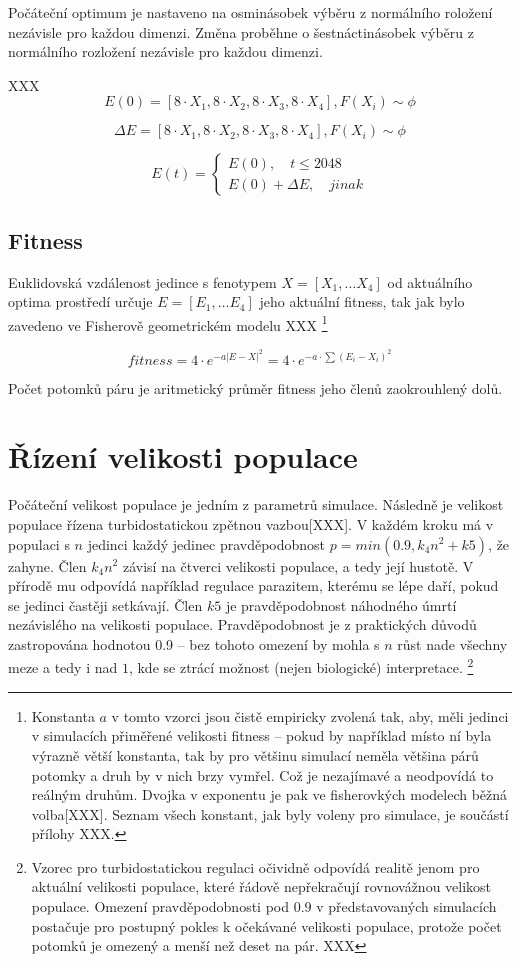 Počáteční optimum je nastaveno na osminásobek výběru z normálního roložení nezávisle pro každou dimenzi. Změna proběhne o šestnáctinásobek výběru z normálního rozložení nezávisle pro každou dimenzi.

XXX
$$
E(0) =  [8{\cdot}X_1, 8{\cdot}X_2, 8{\cdot}X_3, 8{\cdot}X_4], F(X_i) \sim \phi
$$

$$
\Delta{E} = [8{\cdot}X_1, 8{\cdot}X_2, 8{\cdot}X_3, 8{\cdot}X_4], F(X_i) \sim \phi
$$

$$
E(t) = \left \{
     \begin{array}{l} E(0), \quad t \leq 2048 \\
                      E(0) + \Delta{E}, \quad jinak
\end{array} \right .
$$

\subsection{Fitness}

Euklidovská vzdálenost jedince s fenotypem $X = [X_1,\dots{}X_4]$ od aktuálního optima prostředí určuje
$E = [E_1,\dots{} E_4]$ jeho aktuální fitness, tak jak bylo zavedeno ve Fisherově geometrickém modelu XXX
\footnote{Konstanta $a$ v tomto vzorci jsou čistě empiricky zvolená tak, aby, měli jedinci v simulacích
přiměřené velikosti fitness -- pokud by například místo ní byla výrazně větší konstanta, tak by pro většinu simulací
neměla většina párů potomky a druh by v nich brzy vymřel. Což je nezajímavé a neodpovídá to reálným druhům.
Dvojka v exponentu je pak ve fisherovkých modelech běžná volba[XXX].
Seznam všech konstant, jak byly voleny pro simulace, je součástí přílohy XXX.}

$$fitness = 4{\cdot}e^{-a |E-X|^2} = 4{\cdot}e^{-a\cdot{\sum{(E_i - X_i)^2}}}$$

Počet potomků páru je aritmetický průměr fitness jeho členů zaokrouhlený dolů.


\section{Řízení velikosti populace}

Počáteční velikost populace je jedním z parametrů simulace. Následně je velikost populace řízena turbidostatickou
zpětnou vazbou[XXX]. V každém kroku má v populaci s $n$ jedinci každý jedinec pravděpodobnost
$p = min(0.9, k_4 n^2 + k5)$, že zahyne. Člen $k_4 n^2$ závisí na čtverci velikosti populace, a tedy její hustotě.
V přírodě mu odpovídá například regulace parazitem, kterému se lépe daří, pokud se jedinci častěji setkávají.
Člen $k5$ je pravděpodobnost náhodného úmrtí nezávislého na velikosti populace. Pravděpodobnost je z praktických důvodů
zastropována hodnotou 0.9 -- bez tohoto omezení by mohla s $n$ růst nade všechny meze a tedy i nad $1$, kde se ztrácí
možnost (nejen biologické) interpretace.
\footnote{Vzorec pro turbidostatickou regulaci očividně odpovídá realitě jenom pro aktuální velikosti populace,
které řádově nepřekračují rovnovážnou velikost populace. Omezení pravděpodobnosti pod $0.9$ v představovaných
simulacích postačuje pro postupný pokles k očekávané velikosti populace, protože počet potomků je omezený a
menší než deset na pár. XXX}

